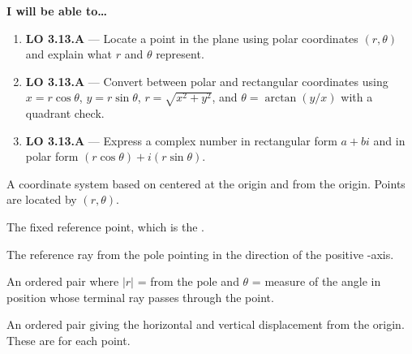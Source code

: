 \documentclass[10pt]{article}
\begin{document}
\namedateperiod

\vspace{0.10in}

\begin{objectivebox}
\textbf{I will be able to\ldots}
\begin{enumerate}[leftmargin=1.5em, itemsep=4pt]
  \item \textbf{LO 3.13.A} --- Locate a point in the plane using polar
    coordinates $(r,\theta)$ and explain what $r$ and $\theta$ represent.
  \item \textbf{LO 3.13.A} --- Convert between polar and rectangular
    coordinates using $x = r\cos\theta$, $y = r\sin\theta$, $r = \sqrt{x^2+y^2}$,
    and $\theta = \arctan(y/x)$ with a quadrant check.
  \item \textbf{LO 3.13.A} --- Express a complex number in rectangular form
    $a+bi$ and in polar form $(r\cos\theta)+i(r\sin\theta)$.
\end{enumerate}
\end{objectivebox}

\vspace{0.08in}

\begin{vocabbox}
\begin{description}[leftmargin=0pt, itemsep=6pt]
  \item[\termblanklong{polar coordinate system}]
    A coordinate system based on  centered at the origin
    and  from the origin. Points are located by $(r,\theta)$.

  \item[\termblanklong{pole}]
    The fixed reference point, which is the .

  \item[\termblanklong{polar axis}]
    The reference ray from the pole pointing in the direction of the positive
    -axis.

  \item[\termblanklong{polar coordinates $(r,\theta)$}]
    An ordered pair where $|r|$ =  from the pole and
    $\theta$ = measure of the angle in  position whose
    terminal ray passes through the point.

  \item[\termblanklong{rectangular coordinates $(x,y)$}]
    An ordered pair giving the horizontal and vertical displacement from the
    origin. These are  for each point.
\end{description}
\end{vocabbox}
\end{document}
